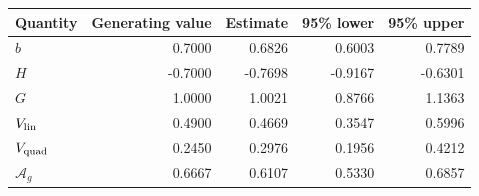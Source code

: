 \begin{tabular}{lrrrr}\toprule
Quantity & Generating value & Estimate & 95\% lower & 95\% upper \\ \midrule
$b$ & 0.7000 & 0.6826 & 0.6003 & 0.7789 \\
$H$ & -0.7000 & -0.7698 & -0.9167 & -0.6301 \\
$G$ & 1.0000 & 1.0021 & 0.8766 & 1.1363 \\
$V_{\rm lin}$ & 0.4900 & 0.4669 & 0.3547 & 0.5996 \\
$V_{\rm quad}$ & 0.2450 & 0.2976 & 0.1956 & 0.4212 \\
$\mathcal A_g$ & 0.6667 & 0.6107 & 0.5330 & 0.6857 \\
\bottomrule\end{tabular}
